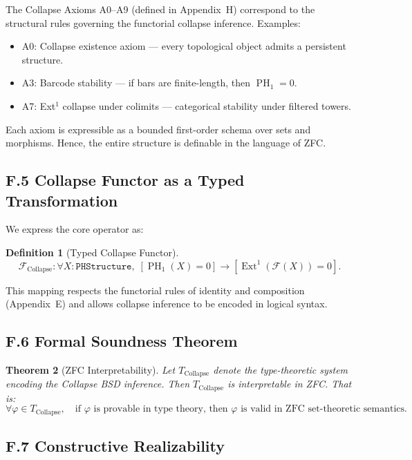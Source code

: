 \documentclass[11pt]{article}
\newtheorem{theorem}{Theorem}[section]
\newtheorem{definition}[theorem]{Definition}
\DeclareMathOperator{\Ext}{Ext}
\DeclareMathOperator{\PH}{PH}
\begin{document}
The Collapse Axioms A0–A9 (defined in Appendix~H) correspond to the structural rules governing the functorial collapse inference.  
Examples:

\begin{itemize}
  \item A0: Collapse existence axiom — every topological object admits a persistent structure.
  \item A3: Barcode stability — if bars are finite-length, then $\PH_1 = 0$.
  \item A7: Ext$^1$ collapse under colimits — categorical stability under filtered towers.
\end{itemize}

Each axiom is expressible as a bounded first-order schema over sets and morphisms.  
Hence, the entire structure is definable in the language of ZFC.

\subsection*{F.5 Collapse Functor as a Typed Transformation}

We express the core operator as:

\begin{definition}[Typed Collapse Functor]
\[
\mathcal{F}_{\mathrm{Collapse}} :
\forall X : \texttt{PHStructure},\;
[\PH_1(X) = 0] \to [\Ext^1(\mathcal{F}(X)) = 0].
\]
\end{definition}

This mapping respects the functorial rules of identity and composition (Appendix~E) and allows collapse inference to be encoded in logical syntax.

\subsection*{F.6 Formal Soundness Theorem}

\begin{theorem}[ZFC Interpretability]
Let $T_{\mathrm{Collapse}}$ denote the type-theoretic system encoding the Collapse BSD inference.  
Then $T_{\mathrm{Collapse}}$ is interpretable in ZFC. That is:
\[
\forall \varphi \in T_{\mathrm{Collapse}},\quad \text{if } \varphi \text{ is provable in type theory, then } \varphi \text{ is valid in ZFC set-theoretic semantics.}
\]
\end{theorem}

\subsection*{F.7 Constructive Realizability}
\end{document}
